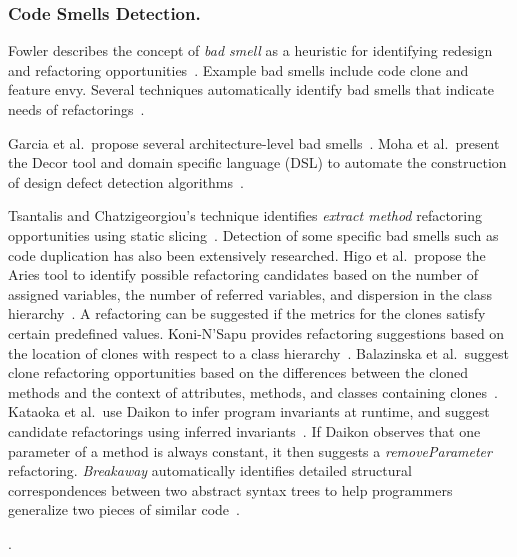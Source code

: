 \subsubsection{Code Smells Detection.} 
\label{sec:codesmell} 

Fowler describes the concept of {\em bad smell} as a heuristic for identifying redesign and refactoring opportunities~\cite{1999:RID}. Example bad smells include code clone and feature envy. Several techniques automatically identify bad smells that indicate needs of refactorings~\cite{Tsantalis2009:extractmethod,Tsantalis2009:movemethod,Tsantalis2008:jdeodorant}. 

Garcia et al.~propose several architecture-level bad smells~\cite{Garcia2009:badsmell}. Moha et al.~present the Decor tool and domain specific language (DSL) to automate the construction of design defect detection algorithms~\cite{Moha2009:designdefect}. 

Tsantalis and Chatzigeorgiou's technique identifies {\em extract method} refactoring opportunities using static slicing~\cite{Tsantalis2009:extractmethod}. Detection of some specific bad smells such as code duplication has also been extensively researched. Higo et al.~propose the Aries tool to identify possible refactoring candidates based on the number of assigned variables, the number of referred variables, and dispersion in the class hierarchy~\cite{Higo2004}. A refactoring can be suggested if the metrics for the clones satisfy certain predefined values. 
Koni-N'Sapu provides refactoring suggestions based on the location of clones with respect to a class hierarchy~\cite{koni_nsapu:ms01}. Balazinska et al.~suggest clone refactoring opportunities based on the differences between the cloned methods and the context of attributes, methods, and classes containing clones~\cite{Balazinska2000:ACA}. Kataoka et al.~use Daikon to infer program invariants at runtime, and suggest candidate refactorings using inferred invariants~\cite{Kataoka2001:ASP}. If Daikon observes that one parameter of a method is always constant, it then suggests a \emph{removeParameter} refactoring. {\it Breakaway} automatically identifies detailed structural correspondences between two abstract syntax trees to help programmers generalize two pieces of similar code~\cite{Cottrell:2007}. 

.

